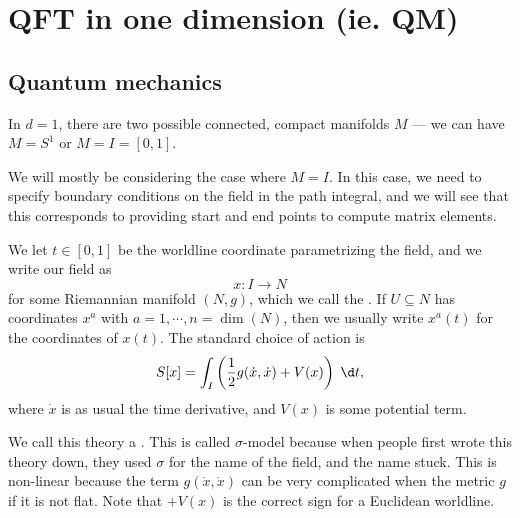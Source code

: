 \documentclass[a4paper]{article}
\begin{document}
\section{QFT in one dimension (ie. QM)}
\subsection{Quantum mechanics}
In $d = 1$, there are two possible connected, compact manifolds $M$ --- we can have $M = S^1$ or $M = I = [0, 1]$.
\begin{center}
\end{center}
We will mostly be considering the case where $M = I$. In this case, we need to specify boundary conditions on the field in the path integral, and we will see that this corresponds to providing start and end points to compute matrix elements.

We let $t \in [0, 1]$ be the worldline coordinate parametrizing the field, and we write our field as
\[
  x: I \to N
\]
for some Riemannian manifold $(N, g)$, which we call the . If $U\subseteq N$ has coordinates $x^a$ with $a = 1, \cdots, n = \dim (N)$, then we usually write $x^a(t)$ for the coordinates of $x(t)$. The standard choice of action is
\[
  S[x] = \int_I \left(\frac{1}{2} g(\dot{x}, \dot{x}) + V(x)\right)\;\d t,
\]
where $\dot{x}$ is as usual the time derivative, and $V(x)$ is some potential term.

We call this theory a . This is called $\sigma$-model because when people first wrote this theory down, they used $\sigma$ for the name of the field, and the name stuck. This is non-linear because the term $g(\dot{x}, \dot{x})$ can be very complicated when the metric $g$ if it is not flat. Note that $+V(x)$ is the correct sign for a Euclidean worldline.
\end{document}
